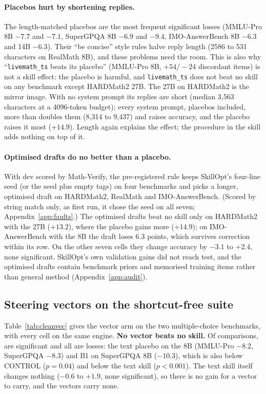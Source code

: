 \documentclass[11pt]{article}
\begin{document}
\paragraph{Placebos hurt by shortening replies.} The length-matched placebos are the most frequent
significant losses (MMLU-Pro 8B $-7.7$ and $-7.1$, SuperGPQA 8B $-6.9$ and $-9.4$, IMO-AnswerBench
8B $-6.3$ and 14B $-6.3$). Their ``be concise'' style rules halve reply length (2586 to 531 characters
on RealMath 8B), and these problems need the room. This is also why ``\texttt{livemath\_ts} beats its
placebo'' (MMLU-Pro 8B, $+54/-24$ discordant items) is not a skill effect: the placebo is harmful,
and \texttt{livemath\_ts} does not beat no skill on any benchmark except HARDMath2 27B.
The 27B on HARDMath2 is the mirror image. With no system prompt its replies are short (median 3{,}563
characters at a 4096-token budget); every system prompt, placebos included, more than doubles them
(8{,}314 to 9{,}437) and raises accuracy, and the placebo raises it most ($+14.9$). Length again
explains the effect; the procedure in the skill adds nothing on top of it.

\paragraph{Optimised drafts do no better than a placebo.} With dev scored by Math-Verify, the
pre-registered rule keeps SkillOpt's four-line seed (or the seed plus empty tags) on four benchmarks
and picks a longer, optimised draft on HARDMath2, RealMath and IMO-AnswerBench. (Scored by string
match only, as first run, it chose the seed on all seven; Appendix~\ref{app:faults}.) The optimised
drafts beat no skill only on HARDMath2 with the 27B ($+13.2$), where the placebo gains more
($+14.9$); on IMO-AnswerBench with the 8B the draft loses $6.3$ points, which survives correction
within its row. On the other seven cells they change accuracy by $-3.1$ to $+2.4$, none significant.
SkillOpt's own validation gains did not reach test, and the optimised drafts contain benchmark
priors and memorised training items rather than general method (Appendix~\ref{app:audit}).

\subsection{Steering vectors on the shortcut-free suite}
\label{sec:cleanvec}

Table~\ref{tab:cleanvec} gives the vector arm on the two multiple-choice benchmarks, with every
cell on the same engine. \textbf{No vector beats no skill.} Of \nVecTests{} comparisons, \nVecSig{}
are significant and all are losses: the text placebo on the 8B (MMLU-Pro $-8.2$, SuperGPQA $-8.3$)
and B1 on SuperGPQA 8B ($-10.3$), which is also below CONTROL ($p=0.04$) and below the text skill
($p<0.001$). The text skill itself changes nothing ($-0.6$ to $+1.9$, none significant), so there is
no gain for a vector to carry, and the vectors carry none.
\end{document}
